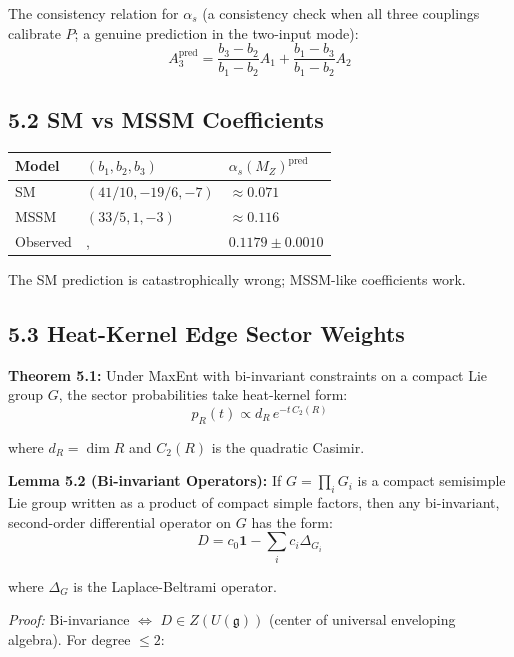The consistency relation for \(\alpha_s\) (a consistency check when all three couplings calibrate $P$; a genuine prediction in the two-input mode): \[A_3^{\text{pred}} = \frac{b_3 - b_2}{b_1 - b_2}A_1 + \frac{b_1 - b_3}{b_1 - b_2}A_2\]

\subsection{5.2 SM vs MSSM Coefficients}\label{52-sm-vs-mssm-coefficients}

{\def\LTcaptype{none} %
\begin{longtable}[]{@{}>{\RaggedRight\arraybackslash}p{}>{\RaggedRight\arraybackslash}p{}>{\RaggedRight\arraybackslash}p{}@{}}
\toprule\noalign{}
Model & \((b_1, b_2, b_3)\) & \(\alpha_s(M_Z)^{\text{pred}}\) \\
\midrule\noalign{}
\endhead
\bottomrule\noalign{}
\endlastfoot
SM & \((41/10, -19/6, -7)\) & \(\approx 0.071\) \\
MSSM & \((33/5, 1, -3)\) & \(\approx 0.116\) \\
Observed & , & \(0.1179 \pm 0.0010\) \\
\end{longtable}
}

The SM prediction is catastrophically wrong; MSSM-like coefficients work.

\subsection{5.3 Heat-Kernel Edge Sector Weights}\label{53-heat-kernel-edge-sector-weights}

\textbf{Theorem 5.1:} Under MaxEnt with bi-invariant constraints on a compact Lie group \(G\), the sector probabilities take heat-kernel form: \[p_R(t) \propto d_R \, e^{-t \, C_2(R)}\]

where \(d_R = \dim R\) and \(C_2(R)\) is the quadratic Casimir.

\textbf{Lemma 5.2 (Bi-invariant Operators):} If \(G=\prod_i G_i\) is a compact semisimple Lie group written as a product of compact simple factors, then any bi-invariant, second-order differential operator on \(G\) has the form: \[D = c_0 \mathbf{1} - \sum_i c_i \Delta_{G_i}\]

where \(\Delta_G\) is the Laplace-Beltrami operator.

\emph{Proof:} Bi-invariance \(\Leftrightarrow\) \(D \in Z(U(\mathfrak{g}))\) (center of universal enveloping algebra). For degree \(\leq 2\):

